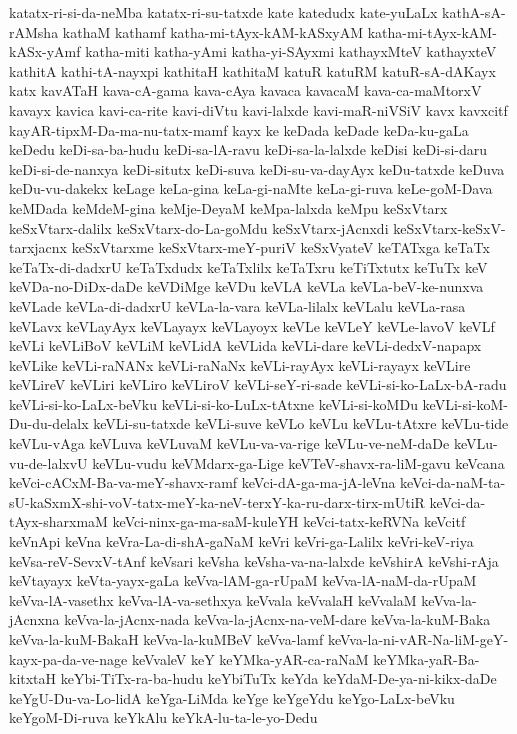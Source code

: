 {katatx-ri-si-da-neMba
katatx-ri-su-tatxde
kate
katedudx
kate-yuLaLx
kathA-sA-rAMsha
kathaM
kathamf
katha-mi-tAyx-kAM-kASxyAM
katha-mi-tAyx-kAM-kASx-yAmf
katha-miti
katha-yAmi
katha-yi-SAyxmi
kathayxMteV
kathayxteV
kathitA
kathi-tA-nayxpi
kathitaH
kathitaM
katuR
katuRM
katuR-sA-dAKayx
katx
kavATaH
kava-cA-gama
kava-cAya
kavaca
kavacaM
kava-ca-maMtorxV
kavayx
kavica
kavi-ca-rite
kavi-diVtu
kavi-lalxde
kavi-maR-niVSiV
kavx
kavxcitf
kayAR-tipxM-Da-ma-nu-tatx-mamf
kayx
ke
keDada
keDade
keDa-ku-gaLa
keDedu
keDi-sa-ba-hudu
keDi-sa-lA-ravu
keDi-sa-la-lalxde
keDisi
keDi-si-daru
keDi-si-de-nanxya
keDi-situtx
keDi-suva
keDi-su-va-dayAyx
keDu-tatxde
keDuva
keDu-vu-dakekx
keLage
keLa-gina
keLa-gi-naMte
keLa-gi-ruva
keLe-goM-Dava
keMDada
keMdeM-gina
keMje-DeyaM
keMpa-lalxda
keMpu
keSxVtarx
keSxVtarx-dalilx
keSxVtarx-do-La-goMdu
keSxVtarx-jAcnxdi
keSxVtarx-keSxV-tarxjacnx
keSxVtarxme
keSxVtarx-meY-puriV
keSxVyateV
keTATxga
keTaTx
keTaTx-di-dadxrU
keTaTxdudx
keTaTxlilx
keTaTxru
keTiTxtutx
keTuTx
keV
keVDa-no-DiDx-daDe
keVDiMge
keVDu
keVLA
keVLa
keVLa-beV-ke-nunxva
keVLade
keVLa-di-dadxrU
keVLa-la-vara
keVLa-lilalx
keVLalu
keVLa-rasa
keVLavx
keVLayAyx
keVLayayx
keVLayoyx
keVLe
keVLeY
keVLe-lavoV
keVLf
keVLi
keVLiBoV
keVLiM
keVLidA
keVLida
keVLi-dare
keVLi-dedxV-napapx
keVLike
keVLi-raNANx
keVLi-raNaNx
keVLi-rayAyx
keVLi-rayayx
keVLire
keVLireV
keVLiri
keVLiro
keVLiroV
keVLi-seY-ri-sade
keVLi-si-ko-LaLx-bA-radu
keVLi-si-ko-LaLx-beVku
keVLi-si-ko-LuLx-tAtxne
keVLi-si-koMDu
keVLi-si-koM-Du-du-delalx
keVLi-su-tatxde
keVLi-suve
keVLo
keVLu
keVLu-tAtxre
keVLu-tide
keVLu-vAga
keVLuva
keVLuvaM
keVLu-va-va-rige
keVLu-ve-neM-daDe
keVLu-vu-de-lalxvU
keVLu-vudu
keVMdarx-ga-Lige
keVTeV-shavx-ra-liM-gavu
keVcana
keVci-cACxM-Ba-va-meY-shavx-ramf
keVci-dA-ga-ma-jA-leVna
keVci-da-naM-ta-sU-kaSxmX-shi-voV-tatx-meY-ka-neV-terxY-ka-ru-darx-tirx-mUtiR
keVci-da-tAyx-sharxmaM
keVci-ninx-ga-ma-saM-kuleYH
keVci-tatx-keRVNa
keVcitf
keVnApi
keVna
keVra-La-di-shA-gaNaM
keVri
keVri-ga-Lalilx
keVri-keV-riya
keVsa-reV-SevxV-tAnf
keVsari
keVsha
keVsha-va-na-lalxde
keVshirA
keVshi-rAja
keVtayayx
keVta-yayx-gaLa
keVva-lAM-ga-rUpaM
keVva-lA-naM-da-rUpaM
keVva-lA-vasethx
keVva-lA-va-sethxya
keVvala
keVvalaH
keVvalaM
keVva-la-jAcnxna
keVva-la-jAcnx-nada
keVva-la-jAcnx-na-veM-dare
keVva-la-kuM-Baka
keVva-la-kuM-BakaH
keVva-la-kuMBeV
keVva-lamf
keVva-la-ni-vAR-Na-liM-geY-kayx-pa-da-ve-nage
keVvaleV
keY
keYMka-yAR-ca-raNaM
keYMka-yaR-Ba-kitxtaH
keYbi-TiTx-ra-ba-hudu
keYbiTuTx
keYda
keYdaM-De-ya-ni-kikx-daDe
keYgU-Du-va-Lo-lidA
keYga-LiMda
keYge
keYgeYdu
keYgo-LaLx-beVku
keYgoM-Di-ruva
keYkAlu
keYkA-lu-ta-le-yo-Dedu
}
